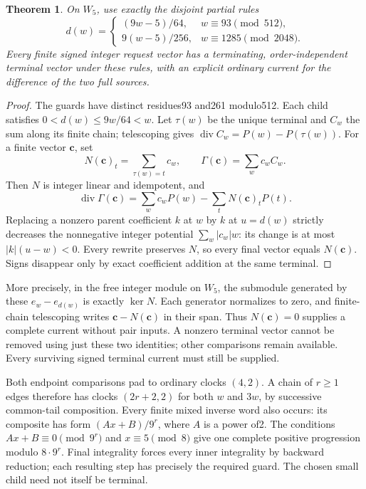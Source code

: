 \documentclass[11pt]{article}
\newtheorem{theorem}{Theorem}
\begin{document}
\begin{theorem}\label{thm:frontiernormal}
On $W_5$, use exactly the disjoint partial rules
\[
 d(w)=
 \begin{cases}
 (9w-5)/64,&w\equiv93\pmod{512},\\
 9(w-5)/256,&w\equiv1285\pmod{2048}.
 \end{cases}
\]
Every finite signed integer request vector has a terminating,
order-independent terminal vector under these rules, with an explicit
ordinary current for the difference of the two full sources.
\end{theorem}
\begin{proof}
The guards have distinct residues93 and261 modulo512.
Each child satisfies $0<d(w)\le9w/64<w$.
Let $\tau(w)$ be the unique terminal and $C_w$ the sum along its finite
chain; telescoping gives $\operatorname{div}C_w=P(w)-P(\tau(w))$.
For a finite vector $\mathbf c$, set
\[
 N(\mathbf c)_t=\sum_{\tau(w)=t}c_w,\qquad
 \Gamma(\mathbf c)=\sum_wc_wC_w.
\]
Then $N$ is integer linear and idempotent, and
\[
 \operatorname{div}\Gamma(\mathbf c)
   =\sum_wc_wP(w)-\sum_tN(\mathbf c)_tP(t).
\]
Replacing a nonzero parent coefficient $k$ at $w$ by $k$ at $u=d(w)$
strictly decreases the nonnegative integer potential
$\sum_w|c_w|w$: its change is at most $|k|(u-w)<0$.
Every rewrite preserves $N$, so every final vector equals $N(\mathbf c)$.
Signs disappear only by exact coefficient addition at the same terminal.
\end{proof}

More precisely, in the free integer module on $W_5$, the submodule
generated by these $e_w-e_{d(w)}$ is exactly $\ker N$. Each generator
normalizes to zero, and finite-chain telescoping writes
$\mathbf c-N(\mathbf c)$ in their span. Thus $N(\mathbf c)=0$ supplies a
complete current without pair inputs. A nonzero terminal vector cannot
be removed using just these two identities; other comparisons remain
available. Every surviving signed terminal current must still be supplied.

Both endpoint comparisons pad to ordinary clocks $(4,2)$.
A chain of $r\ge1$ edges therefore has clocks $(2r+2,2)$ for both
$w$ and $3w$, by successive common-tail composition.
Every finite mixed inverse word also occurs: its composite has form
$(Ax+B)/9^r$, where $A$ is a power of2.
The conditions $Ax+B\equiv0\pmod{9^r}$ and $x\equiv5\pmod8$ give
one complete positive progression modulo $8\cdot9^r$.
Final integrality forces every inner integrality by backward reduction;
each resulting step has precisely the required guard.
The chosen small child need not itself be terminal.
\end{document}
